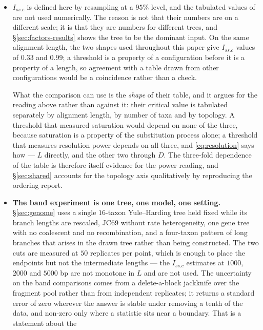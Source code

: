 \documentclass[preprint,12pt,authoryear]{elsarticle}
\newcommand{\Issc}{I_{ss.c}}
\theoremstyle{definition}
\theoremstyle{remark}
\begin{document}
\begin{itemize}
  That conclusion is not transferable to the setting
  \citet{zhang2025caster} work in, for the reasons set out in the last item
  of this section.
\item $\Issc$ is defined here by resampling at a $95\%$ level, and the
  tabulated values of \citet{xia2003iss} are not used numerically. The reason
  is not that their numbers are on a different scale; it is that they are
  numbers for different trees, and \S\ref{sec:factors-results} shows the tree to be
  the dominant input. On the same alignment length, the two shapes used
  throughout this paper give $\Issc$ values of $0.33$ and $0.99$; a threshold
  is a property of a configuration before it is a property of a length, so
  agreement with a table drawn from other configurations would be a
  coincidence rather than a check.

  What the comparison can use is the \emph{shape} of their table, and it
  argues for the reading above rather than against it: their critical value
  is tabulated separately by alignment length, by number of taxa and by
  topology. A threshold that measured saturation would depend on none of the
  three, because saturation is a property of the substitution process alone;
  a threshold that measures resolution power depends on all three, and
  \eqref{eq:resolution} says how --- $L$ directly, and the other two through
  $D$. The three-fold dependence of the table is therefore itself
  evidence for the power reading, and \S\ref{sec:shared} accounts for the
  topology axis qualitatively by reproducing the ordering
  \citet{xia2003iss} report.
\item \textbf{The band experiment is one tree, one model, one setting.}
  \S\ref{sec:genome} uses a single $16$-taxon Yule--Harding tree held fixed
  while its branch lengths are rescaled, JC69 without rate heterogeneity, one
  gene tree with no coalescent and no recombination, and a four-taxon
  pattern of long branches that arises in the drawn tree rather than being
  constructed. The two cuts are measured at $50$ replicates per point, which
  is enough to place the endpoints but not the intermediate lengths --- the
  $\Issc$ estimates at $1000$, $2000$ and $5000$ bp are not monotone in $L$
  and are not used. The uncertainty on the band comparisons comes from a
  delete-a-block jackknife over the fragment pool rather than from
  independent replicates; it returns a standard error of zero wherever the
  answer is stable under removing a tenth of the data, and non-zero only
  where a statistic sits near a boundary. That is a statement about the

\end{itemize}
\end{document}
